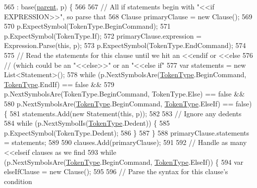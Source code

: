 \begin{DoxyCode}
565                                                              : base(\hyperlink{a00148_af313a82103fcc2ff5a177dbb06b92f7b}{parent}, p) \{
566 
567                 \textcolor{comment}{// All if statements begin with "<<if EXPRESSION>>", so parse that}
568                 Clause primaryClause = \textcolor{keyword}{new} Clause();
569 
570                 p.ExpectSymbol(TokenType.BeginCommand);
571                 p.ExpectSymbol(TokenType.If);
572                 primaryClause.expression = Expression.Parse(\textcolor{keyword}{this}, p);
573                 p.ExpectSymbol(TokenType.EndCommand);
574 
575                 \textcolor{comment}{// Read the statements for this clause until  we hit an <<endif or <<else}
576                 \textcolor{comment}{// (which could be an "<<else>>" or an "<<else if"}
577                 var statements = \textcolor{keyword}{new} List<Statement>();
578                 \textcolor{keywordflow}{while} (p.NextSymbolsAre(\hyperlink{a00051_a301aa7c866593a5b625a8fc158bbeace}{TokenType}.BeginCommand, 
      \hyperlink{a00051_a301aa7c866593a5b625a8fc158bbeace}{TokenType}.EndIf) == \textcolor{keyword}{false} &&
579                     p.NextSymbolsAre(TokenType.BeginCommand, TokenType.Else) == \textcolor{keyword}{false} &&
580                     p.NextSymbolsAre(\hyperlink{a00051_a301aa7c866593a5b625a8fc158bbeace}{TokenType}.BeginCommand, \hyperlink{a00051_a301aa7c866593a5b625a8fc158bbeace}{TokenType}.ElseIf) == \textcolor{keyword}{false}) 
      \{
581                     statements.Add(\textcolor{keyword}{new} Statement(\textcolor{keyword}{this}, p));
582 
583                     \textcolor{comment}{// Ignore any dedents}
584                     \textcolor{keywordflow}{while} (p.NextSymbolIs(\hyperlink{a00051_a301aa7c866593a5b625a8fc158bbeace}{TokenType}.Dedent)) \{
585                         p.ExpectSymbol(TokenType.Dedent);
586                     \}
587                 \}
588                 primaryClause.statements = statements;
589 
590                 clauses.Add(primaryClause);
591 
592                 \textcolor{comment}{// Handle as many <<elseif clauses as we find}
593                 \textcolor{keywordflow}{while} (p.NextSymbolsAre(\hyperlink{a00051_a301aa7c866593a5b625a8fc158bbeace}{TokenType}.BeginCommand, 
      \hyperlink{a00051_a301aa7c866593a5b625a8fc158bbeace}{TokenType}.ElseIf)) \{
594                     var elseIfClause = \textcolor{keyword}{new} Clause();
595 
596                     \textcolor{comment}{// Parse the syntax for this clause's condition}

\end{DoxyCode}
